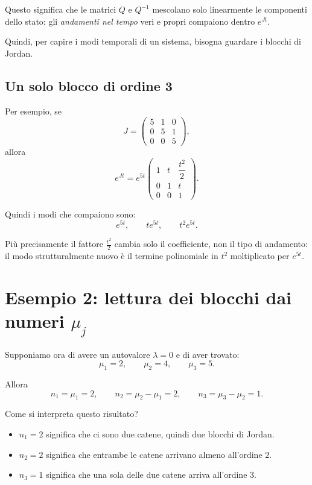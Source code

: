 Questo significa che le matrici $Q$ e $Q^{-1}$ mescolano solo linearmente le componenti dello stato: gli \emph{andamenti nel tempo} veri e propri compaiono dentro $e^{Jt}$.

Quindi, per capire i modi temporali di un sistema, bisogna guardare i blocchi di Jordan.

\subsection{Un solo blocco di ordine 3}

Per esempio, se
\[
J=
\begin{pmatrix}
5 & 1 & 0\\
0 & 5 & 1\\
0 & 0 & 5
\end{pmatrix},
\]
allora
\[
e^{Jt}
=
e^{5t}
\begin{pmatrix}
1 & t & \dfrac{t^2}{2}\\
0 & 1 & t\\
0 & 0 & 1
\end{pmatrix}.
\]

Quindi i modi che compaiono sono:
\[
e^{5t},\qquad te^{5t},\qquad t^2 e^{5t}.
\]

Più precisamente il fattore $\frac{t^2}{2}$ cambia solo il coefficiente, non il tipo di andamento: il modo strutturalmente nuovo è il termine polinomiale in $t^2$ moltiplicato per $e^{5t}$.

\section{Esempio 2: lettura dei blocchi dai numeri \texorpdfstring{$\mu_j$}{muj}}

Supponiamo ora di avere un autovalore $\lambda=0$ e di aver trovato:
\[
\mu_1=2,\qquad \mu_2=4,\qquad \mu_3=5.
\]

Allora
\[
n_1 = \mu_1 = 2,
\qquad
n_2 = \mu_2-\mu_1 = 2,
\qquad
n_3 = \mu_3-\mu_2 = 1.
\]

Come si interpreta questo risultato?

\begin{itemize}
    \item $n_1=2$ significa che ci sono due catene, quindi due blocchi di Jordan.
    \item $n_2=2$ significa che entrambe le catene arrivano almeno all'ordine $2$.
    \item $n_3=1$ significa che una sola delle due catene arriva all'ordine $3$.
\end{itemize}

